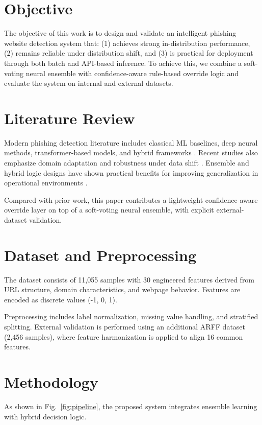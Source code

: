﻿\documentclass[conference]{IEEEtran}
\begin{document}
\section{Objective}
The objective of this work is to design and validate an intelligent phishing website detection system that: (1) achieves strong in-distribution performance, (2) remains reliable under distribution shift, and (3) is practical for deployment through both batch and API-based inference. To achieve this, we combine a soft-voting neural ensemble with confidence-aware rule-based override logic and evaluate the system on internal and external datasets.

\section{Literature Review}
Modern phishing detection literature includes classical ML baselines, deep neural methods, transformer-based models, and hybrid frameworks \cite{su2023bert,haq2024cnn,electronics2024multimodal,kibriya2025llm}. Recent studies also emphasize domain adaptation and robustness under data shift \cite{rashid2024uda,komosny2025languages,duarte2025parked}. Ensemble and hybrid logic designs have shown practical benefits for improving generalization in operational environments \cite{zhou2025enlem,barik2025optimization,zhou2025logicconstraint}.

Compared with prior work, this paper contributes a lightweight confidence-aware override layer on top of a soft-voting neural ensemble, with explicit external-dataset validation.

\section{Dataset and Preprocessing}
The dataset consists of 11,055 samples with 30 engineered features derived from URL structure, domain characteristics, and webpage behavior. Features are encoded as discrete values (-1, 0, 1).

Preprocessing includes label normalization, missing value handling, and stratified splitting. External validation is performed using an additional ARFF dataset (2,456 samples), where feature harmonization is applied to align 16 common features.

\section{Methodology}
As shown in Fig.~\ref{fig:pipeline}, the proposed system integrates ensemble learning with hybrid decision logic.
\end{document}
